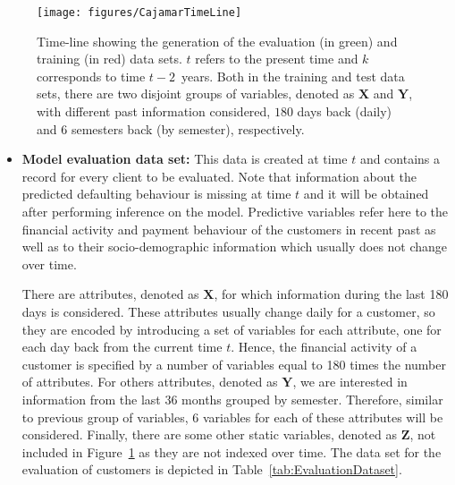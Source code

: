 \documentclass{article}
\theoremstyle{theorem}
\theoremstyle{definition}
\newcommand{\X}{\mathbf{X}}
\newcommand{\Y}{\mathbf{Y}}
\newcommand{\Z}{\mathbf{Z}}
\begin{document}
{\begin{figure}[ht!]
\centering
\texttt{[image: figures/CajamarTimeLine]}
\caption{\label{Figure:CajaMarTimeLine}Time-line showing the generation of the evaluation (in green) and training (in red) data sets. $t$ refers to the present time and $k$ corresponds to time $t-2$\ years. Both in the training and test data sets, there are two disjoint groups of variables, denoted as $\X$ and $\Y$, with different past information considered, $180$ days back (daily) and $6$ semesters back (by semester), respectively.}

\end{figure}

\begin{itemize}

\item \textbf{Model evaluation data set:} This data is created at time $t$ and contains a record for every client to be evaluated. Note that information about the predicted defaulting behaviour is missing at time $t$ and it will be obtained after performing inference on the model. Predictive variables refer here to the financial activity and payment behaviour of the customers in recent past as well as to their socio-demographic information which usually does not change over time. 

There are attributes, denoted as $\X$, for which information during the last 180 days is considered. 
These attributes usually change daily for a customer, so they are encoded by introducing a set of variables for each attribute, one for each day back from the current time $t$. Hence, the financial activity of a customer is specified by a number of variables equal to 180 times the number of attributes. For others attributes, denoted as $\Y$, we are interested in information from the last $36$ months grouped by semester. 
Therefore, similar to previous group of variables, $6$ variables for each of these attributes will be considered. Finally, there are some other static variables, denoted as $\Z$, not included in Figure~\ref{Figure:CajaMarTimeLine} as they are not indexed over time. The data set for the evaluation of customers is depicted in Table~\ref{tab:EvaluationDataset}. 



\end{itemize}}
\end{document}
